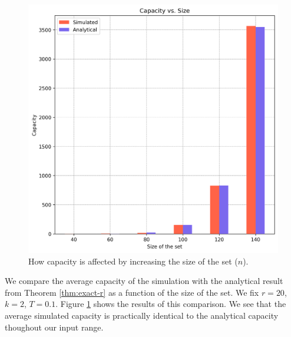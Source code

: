 \begin{figure}%
    \centering
    \includegraphics[scale=0.8]{figures/cap-vs-n.png}
    \caption[Capacity vs. Size of the set ($n$)]{How capacity is affected by increasing the size of the set ($n$).}
    \label{figure:cap-vs-n}
    \end{figure}

We compare the average capacity of the simulation with the analytical result from Theorem \ref{thm:exact-r} as a function of the size of the set. We fix $r=20$, $k=2$, $T=0.1$. Figure \ref{figure:cap-vs-n} shows the results of this comparison. We see that the average simulated capacity is practically identical to the analytical capacity thoughout our input range.



